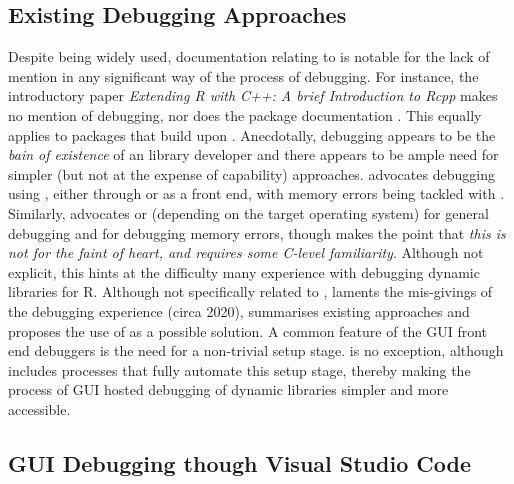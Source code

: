 \hypertarget{exitising-debugging-approaches}{%
\subsection{Existing Debugging Approaches}
\label{exitising-debugging-approaches}}

Despite being widely used, documentation relating to  is notable for the lack of mention in any significant way of the process of debugging. For instance, the 
introductory paper \emph{Extending R with C++: A brief Introduction to Rcpp} \citep{RcppIntro} makes no mention of debugging, nor does the package documentation \citep{Rcpp}. 
This equally applies to packages that build upon . Anecdotally, debugging appears to be the \emph{bain of existence} of an  library developer and 
there appears to be ample need for simpler (but not at the expense of capability) approaches. \citep{DebuggingRandCcodeinR} advocates debugging using 
\citep{GDB}, either through  or \citep{DDD} as a  front end, with memory errors being tackled with \citep{valgrind}. Similarly, 
\citep{DebuggingC_Cpp} advocates  or  \citep{LLDB} (depending on the target operating system) for general debugging and  for debugging memory 
errors, though makes the point that \emph{this is not for the faint of heart, and requires some C-level familiarity}. Although not explicit, this hints at the difficulty
many experience with debugging dynamic libraries for R. Although not specifically related to , \citep{ImprovingCppDebug} laments the mis-givings of the debugging experience 
(circa 2020), summarises existing approaches and proposes the use of \citep{VSCodeDownload} as a possible solution. A common feature of the 
GUI front end debuggers is the need for a non-trivial setup stage.  is no exception, although  includes processes that fully automate
this setup stage, thereby making the process of GUI hosted debugging of  dynamic libraries simpler and more accessible.

\hypertarget{visual-studio-code-extensions}{%
\subsection{GUI Debugging though Visual Studio Code}
\label{visual-studio-code-extensions}}

